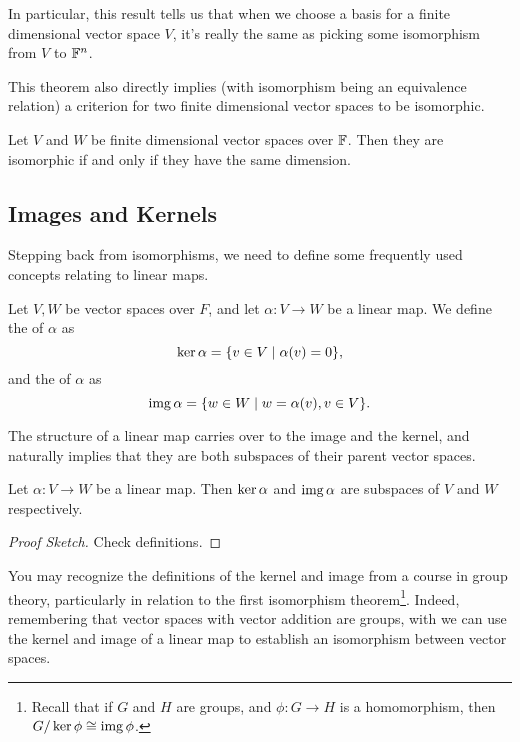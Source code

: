 \documentclass[a4paper]{scrartcl}
\begin{document}
In particular, this result tells us that when we choose a basis for a finite dimensional vector space $V$, it's really the same as picking some isomorphism from $V$ to $\mathbb{F}^n$. 

This theorem also directly implies (with isomorphism being an equivalence relation) a criterion for two finite dimensional vector spaces to be isomorphic.

\begin{theorem}
    Let $V$ and $W$ be finite dimensional vector spaces over $\mathbb{F}$. Then they are isomorphic if and only if they have the same dimension.
\end{theorem}

\subsection{Images and Kernels}

Stepping back from isomorphisms, we need to define some frequently used concepts relating to linear maps.

\begin{definition}
    Let $V, W$ be vector spaces over $F$, and let $\alpha: V \rightarrow W$ be a linear map. We define the  of $\alpha$ as
    $$
    \operatorname{ker} \alpha = \{ v\in V \mid \alpha(v) = 0\},
    $$
    and the  of $\alpha$ as
    $$
    \operatorname{img} \alpha = \{ w \in W \mid w = \alpha(v), v \in V\}.
    $$
\end{definition}

The structure of a linear map carries over to the image and the kernel, and naturally implies that they are both subspaces of their parent vector spaces.

\begin{lemma}
    Let $\alpha: V \rightarrow W$ be a linear map. Then $\operatorname{ker} \alpha$ and $\operatorname{img} \alpha$ are subspaces of $V$ and $W$ respectively.
\end{lemma}
\begin{proof}[Proof Sketch]
    Check definitions.
\end{proof}

You may recognize the definitions of the kernel and image from a course in group theory, particularly in relation to the first isomorphism theorem\footnote{Recall that if $G$ and $H$ are groups, and $\phi: G \rightarrow H$ is a homomorphism, then $G/\operatorname{ker}{\phi} \cong \operatorname{img} \phi$.}. Indeed, remembering that vector spaces with vector addition are groups, with we can use the kernel and image of a linear map to establish an isomorphism between vector spaces.
\end{document}
